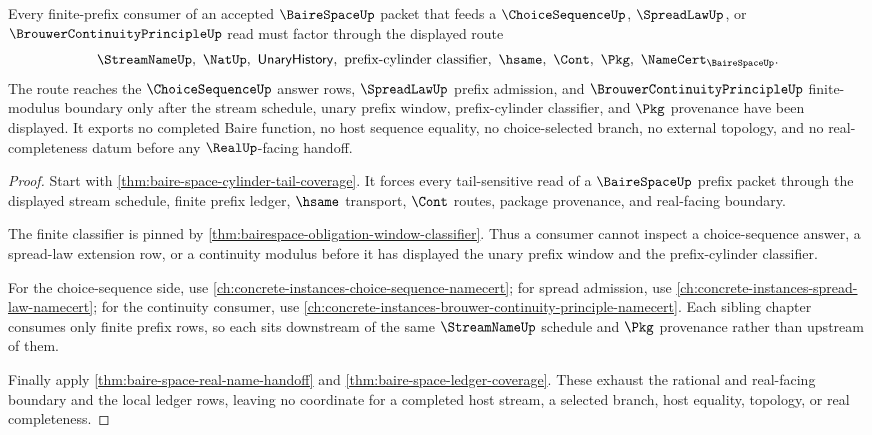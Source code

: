 \begin{theorem}
\label{thm:bairespace-choice-spread-continuity-route}
Every finite-prefix consumer of an accepted $\BaireSpaceUp$ packet that feeds a $\ChoiceSequenceUp$, $\SpreadLawUp$, or $\BrouwerContinuityPrincipleUp$ read must factor through the displayed route
$$
\StreamNameUp,\ \NatUp,\ \mathsf{UnaryHistory},\ \text{prefix-cylinder classifier},\ \hsame,\ \Cont,\ \Pkg,\ \NameCert_{\BaireSpaceUp}.
$$
The route reaches the $\ChoiceSequenceUp$ answer rows, $\SpreadLawUp$ prefix admission, and $\BrouwerContinuityPrincipleUp$ finite-modulus boundary only after the stream schedule, unary prefix window, prefix-cylinder classifier, and $\Pkg$ provenance have been displayed. It exports no completed Baire function, no host sequence equality, no choice-selected branch, no external topology, and no real-completeness datum before any $\RealUp$-facing handoff.
\end{theorem}
\begin{proof}
Start with \autoref{thm:baire-space-cylinder-tail-coverage}. It forces every tail-sensitive read of a $\BaireSpaceUp$ prefix packet through the displayed stream schedule, finite prefix ledger, $\hsame$ transport, $\Cont$ routes, package provenance, and real-facing boundary.

The finite classifier is pinned by \autoref{thm:bairespace-obligation-window-classifier}. Thus a consumer cannot inspect a choice-sequence answer, a spread-law extension row, or a continuity modulus before it has displayed the unary prefix window and the prefix-cylinder classifier.

For the choice-sequence side, use \autoref{ch:concrete-instances-choice-sequence-namecert}; for spread admission, use \autoref{ch:concrete-instances-spread-law-namecert}; for the continuity consumer, use \autoref{ch:concrete-instances-brouwer-continuity-principle-namecert}. Each sibling chapter consumes only finite prefix rows, so each sits downstream of the same $\StreamNameUp$ schedule and $\Pkg$ provenance rather than upstream of them.

Finally apply \autoref{thm:baire-space-real-name-handoff} and \autoref{thm:baire-space-ledger-coverage}. These exhaust the rational and real-facing boundary and the local ledger rows, leaving no coordinate for a completed host stream, a selected branch, host equality, topology, or real completeness.
\end{proof}

